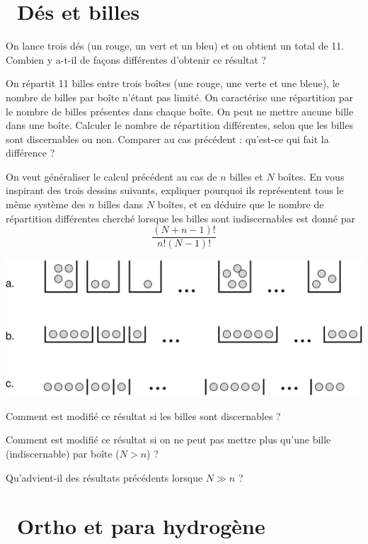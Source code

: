\documentclass[utf8, 11pt]{feuille}
\begin{document}
\section{\medium~Dés et billes}

\question
On lance trois dés (un rouge, un vert et un bleu) et on obtient un total de 11. Combien y a-t-il de façons différentes d'obtenir ce résultat ? 

\question
On répartit 11 billes entre trois boîtes (une rouge, une verte et une bleue), le nombre de billes par boîte n'étant pas limité. On caractérise une répartition par le nombre de billes présentes dans chaque boîte. On peut ne mettre aucune bille dans une boîte. Calculer le nombre de répartition différentes, selon que les billes sont discernables ou non. Comparer au cas précédent : qu'est-ce qui fait la différence ?

\question
On veut généraliser le calcul précédent au cas de $n$ billes et $N$ boîtes. En vous inspirant des trois dessins suivants, expliquer pourquoi ils représentent  tous le même système des $n$ billes dans $N$ boîtes, et en déduire que le nombre de répartition différentes cherché lorsque les billes sont indiscernables est donné par
$$
\frac{(N+n-1)!}{n! (N-1)!}
$$

\centerline{\includegraphics[height=.3\textwidth]{billes}}

\question
Comment est modifié ce résultat si les billes sont discernables ?

\question
Comment est modifié ce résultat si on ne peut pas mettre plus qu'une bille (indiscernable) par boîte ($N>n$) ?

\question
Qu'advient-il des résultats précédents lorsque $N\gg n$ ?



\section{\medium~Ortho et para hydrogène}
\end{document}
